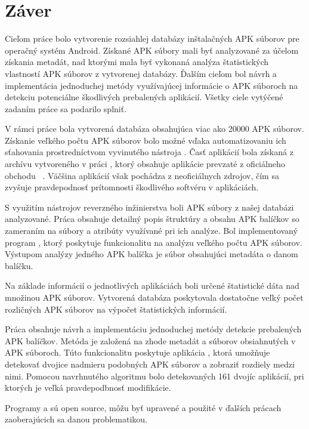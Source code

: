 \chapter{Záver}
Cieľom práce bolo vytvorenie rozsiahlej databázy inštalačných APK súborov pre operačný systém Android. Získané APK súbory mali byť analyzované za účelom získania metadát, nad ktorými mala byť vykonaná analýza štatistických vlastností APK súborov z vytvorenej databázy. Ďalším cieľom bol návrh a implementácia jednoduchej metódy využívajúcej informácie o APK súboroch na detekciu potenciálne škodlivých prebalených aplikácií. Všetky ciele vytýčené zadaním práce sa podarilo splniť.

V rámci práce bola vytvorená databáza obsahujúca viac ako 20000 APK súborov. Získanie veľkého počtu APK súborov bolo možné vďaka automatizovaniu ich sťahovania prostredníctvom vyvinutého nástroja . Časť aplikácií bola získaná z archívu vytvoreného v práci , ktorý obsahuje aplikácie prevzaté z oficiálneho obchodu ~\cite{Viennot2014}. Väčšina aplikácií však pochádza z neoficiálnych zdrojov, čím sa zvyšuje pravdepodnosť prítomnosti škodlivého softvéru v aplikáciách. 

S využitím nástrojov reverzného inžinierstva boli APK súbory z našej databázi analyzované. Práca obsahuje detailný popis štruktúry a obsahu APK balíčkov so zameraním na súbory a atribúty využívané pri ich analýze. Bol implementovaný program , ktorý poskytuje funkcionalitu na analýzu veľkého počtu APK súborov. Výstupom analýzy jedného APK balíčka je súbor obsahujúci metadáta o danom balíčku.

Na základe informácií o jednotlivých aplikáciách boli určené štatistické dáta nad množinou APK súborov. Vytvorená databáza poskytovala dostatočne veľký počet rozličných APK súborov na výpočet štatistických informácií.

Práca obsahuje návrh a implementáciu jednoduchej metódy detekcie prebalených APK balíčkov. Metóda je založená na zhode metadát a súborov obsiahnutých v APK súboroch. Túto funkcionalitu poskytuje aplikácia , ktorá umožňuje detekovať dvojice nadmieru podobných APK súborov a zobraziť rozdiely medzi nimi. Pomocou navrhnutého algoritmu bolo detekovaných 161 dvojíc aplikácií, pri ktorých je veľká pravdepodbnosť modifikácie.

Programy  a  sú open source, môžu byť upravené a použité v ďalších prácach zaoberajúcich sa danou problematikou. 